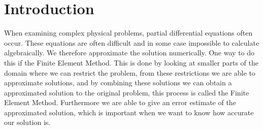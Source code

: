\chapter{Introduction}
When examining complex physical problems, partial differential equations often occur. 
These equations are often difficult and in some case impossible to calculate algebraically.
We therefore approximate the solution numerically.
One way to do this if the Finite Element Method.
This is done by looking at smaller parts of the domain where we can restrict the problem,
from these restrictions we are able to approximate solutions, 
and by combining these solutions we can obtain a approximated solution to the original problem, 
this process is called the Finite Element Method.
Furthermore we are able to give an error estimate of the approximated solution, 
which is important when we want to know how accurate our solution is.